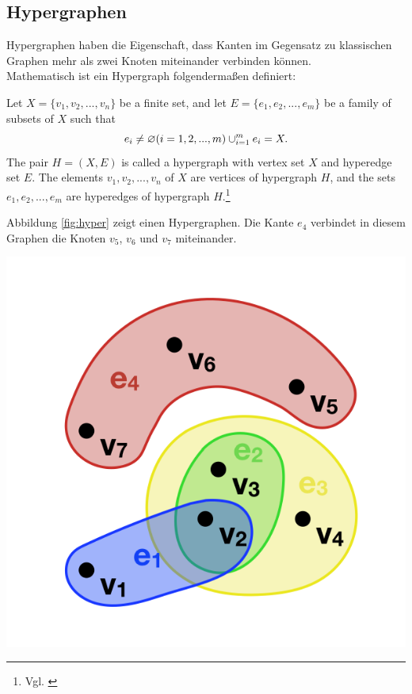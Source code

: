 \subsection{Hypergraphen}
Hypergraphen haben die Eigenschaft, dass Kanten im Gegensatz zu klassischen Graphen mehr als zwei Knoten miteinander verbinden können.
\\Mathematisch ist ein Hypergraph folgendermaßen definiert:
\begin{definition}
	Let $X=\{v_{1}, v_{2},...,v_{n}\}$ be a finite set,
	and let $E=\{e_{1},e_{2},...,e_{m}\}$ be a family of subsets of $X$ such that
	\[e_{i} \neq \varnothing (i=1,2,...,m) \\
	\cup_{i=1}^{m}e_{i}=X.
	\]
	The pair $H=(X,E)$ is called a hypergraph with vertex set $X$
	and hyperedge set $E$. The elements $v_{1}, v_{2},...,v_{n}$ of $X$ are vertices
	of hypergraph $H$, and the sets $e_{1}, e_{2},...,e_{m}$ are hyperedges of hypergraph $H$.\footnote{Vgl. \cite[Seite 2]{zhang2018hypergraph}}
\end{definition}
Abbildung \ref{fig:hyper} zeigt einen Hypergraphen.
Die Kante $e_{4}$ verbindet in diesem Graphen die Knoten $v_{5}$, $v_{6}$ und $v_{7}$ miteinander.
\begin{center}
	\includegraphics[scale = 0.5]{./images/Hypergraph2.png}
	\label{fig:hyper}
\end{center}
